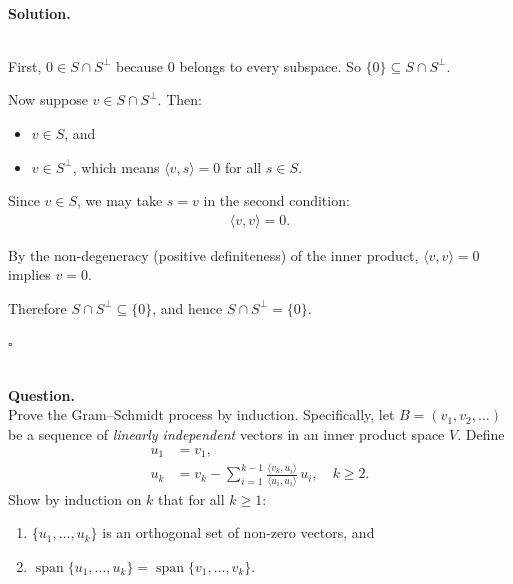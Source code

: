 \documentclass{article}
\begin{document}
\noindent\\
\textbf{Solution.}\\
\quad\\
\begin{mdframed}[linewidth=1pt]
First, $0 \in S \cap S^\perp$ because $0$ belongs to every subspace. So $\{0\} \subseteq S \cap S^\perp$.

Now suppose $v \in S \cap S^\perp$. Then:
\begin{itemize}
    \item $v \in S$, and
    \item $v \in S^\perp$, which means $\langle v, s \rangle = 0$ for all $s \in S$.
\end{itemize}

Since $v \in S$, we may take $s = v$ in the second condition:
\begin{align*}
\langle v, v \rangle = 0.
\end{align*}

By the non-degeneracy (positive definiteness) of the inner product, $\langle v, v \rangle = 0$ implies $v = 0$.

Therefore $S \cap S^\perp \subseteq \{0\}$, and hence $S \cap S^\perp = \{0\}$.

\hfill $\square$
\end{mdframed}

\bigskip

\hfill \break  $~\!\!$ \dotfill \medskip \\
\textbf{Question.}\\
Prove the Gram--Schmidt process by induction. Specifically, let $B = (v_1, v_2, \dots)$ be a sequence of \emph{linearly independent} vectors in an inner product space $V$. Define
\begin{align*}
u_1 &= v_1, \\
u_k &= v_k - \sum_{i=1}^{k-1} \frac{\langle v_k, u_i \rangle}{\langle u_i, u_i \rangle}\, u_i, \quad k \ge 2.
\end{align*}
Show by induction on $k$ that for all $k \ge 1$:
\begin{enumerate}
    \item $\{u_1, \dots, u_k\}$ is an orthogonal set of non-zero vectors, and
    \item $\operatorname{span}\{u_1, \dots, u_k\} = \operatorname{span}\{v_1, \dots, v_k\}$.
\end{enumerate}
\end{document}
